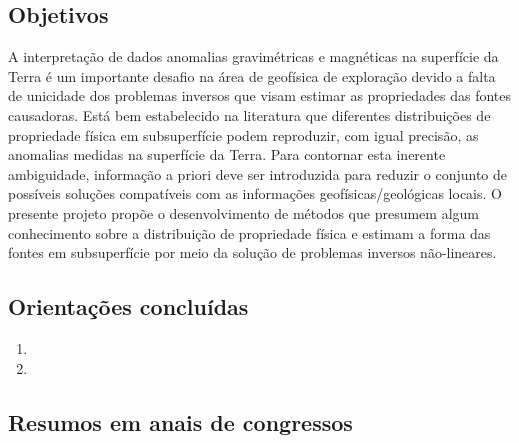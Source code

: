 \subsection*{Objetivos}

A interpretação de dados anomalias gravimétricas e magnéticas na superfície da Terra é um
importante desafio na área de geofísica de exploração devido a falta de unicidade dos
problemas inversos que visam estimar as propriedades das fontes causadoras. Está bem
estabelecido na literatura que diferentes distribuições de propriedade física em
subsuperfície podem reproduzir, com igual precisão, as anomalias medidas na superfície 
da Terra. Para contornar esta inerente ambiguidade, informação a priori deve ser introduzida
para reduzir o conjunto de possíveis soluções compatíveis com as informações
geofísicas/geológicas locais. O presente projeto propõe o desenvolvimento de métodos que
presumem algum conhecimento sobre a distribuição de propriedade física e estimam a forma das
fontes em subsuperfície por meio da solução de problemas inversos não-lineares. 

\subsection*{Orientações concluídas}

\begin{enumerate}
	
	\item{}
	
	\item{}
	
\end{enumerate}

\subsection*{Resumos em anais de congressos}

